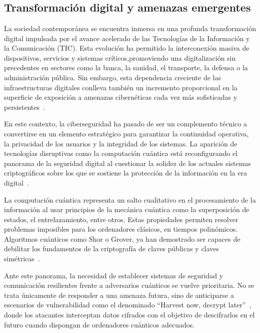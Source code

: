 \chapter{\stateoftheartname}

\section{Transformación digital y amenazas emergentes}
La sociedad contemporánea se encuentra inmersa en una profunda
transformación digital impulsada por el avance acelerado de las Tecnologías de la Información y la Comunicación (TIC). Esta evolución ha permitido la interconexión masiva de dispositivos, servicios y sistemas críticos,promoviendo una digitalización sin precedentes en sectores como la banca, la sanidad, el transporte, la defensa o la administración pública. Sin embargo, esta dependencia creciente de las infraestructuras digitales conlleva también un incremento proporcional en la superficie de exposición a amenazas cibernéticas cada vez más sofisticadas y persistentes~\cite{Saeed2023}. 

En este contexto, la ciberseguridad ha pasado de ser un complemento técnico a convertirse en un elemento estratégico para garantizar la continuidad operativa, la privacidad de los usuarios y la integridad de los sistemas. La aparición de tecnologías disruptivas como la computación cuántica está reconfigurando el panorama de la seguridad digital al cuestionar la solidez de los actuales sistemas criptográficos sobre los que se sostiene la protección de la información en la era digital~\cite{Mosca2018}.

La computación cuántica representa un salto cualitativo en el procesamiento
de la información al usar principios de la mecánica cuántica como la
superposición de estados, el entrelazamiento, entre otros. Estas propiedades
permiten resolver problemas imposibles para los ordenadores clásicos, en
tiempos polinómicos. Algoritmos cuánticos como Shor o Grover, ya han demostrado
ser capaces de debilitar los fundamentos de la criptografía de claves públicas
y claves simétricas~\cite{Shor1997}.

Ante este panorama, la necesidad de establecer sistemas de seguridad y comunicación resilientes frente a adversarios cuánticos se vuelve prioritaria. No se trata únicamente de responder a una amenaza futura, sino de anticiparse a escenarios de vulnerabilidad como el denominado “Harvest now, decrypt later”~\cite{Adeola2025}, donde los atacantes interceptan datos cifrados con el objetivo de descifrarlos en el futuro cuando dispongan de ordenadores cuánticos adecuados.

